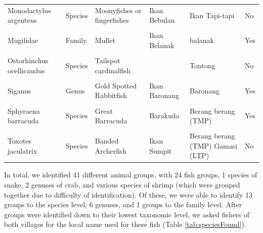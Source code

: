\documentclass[
]{article}
\begin{document}
\begin{landscape}
\begin{table}[H]
\begin{tabular}[t]{llllll}
Monodactylus argenteus & Species & Moonyfishes or fingerfishes & Ikan Bebulan & Ikan Tapi-tapi & No\\
\addlinespace
\cellcolor{gray!10}{Monodactylus argenteus} & \cellcolor{gray!10}{Species} & \cellcolor{gray!10}{Diamondfish} & \cellcolor{gray!10}{} & \cellcolor{gray!10}{Ikan Tapi-tapi} & \cellcolor{gray!10}{No}\\
Mugilidae & Family & Mullet & Ikan Belanak & balanak & Yes\\
\cellcolor{gray!10}{Omobranchus} & \cellcolor{gray!10}{Genus} & \cellcolor{gray!10}{Blenny} & \cellcolor{gray!10}{Jabingan} & \cellcolor{gray!10}{Ikan toto} & \cellcolor{gray!10}{No}\\
Ostorhinchus ocellicaudus & Species & Tailspot cardinalfish &  & Tontong & No\\
\cellcolor{gray!10}{Scatophagus argus} & \cellcolor{gray!10}{Species} & \cellcolor{gray!10}{Spotted Scat} & \cellcolor{gray!10}{Ikan Kiper} & \cellcolor{gray!10}{Titam/Titang} & \cellcolor{gray!10}{Yes}\\
\addlinespace
Siganus & Genus & Gold Spotted Rabbitfish & Ikan Baronang & Baronang & Yes\\
\cellcolor{gray!10}{Sphaeramia orbicularis} & \cellcolor{gray!10}{Species} & \cellcolor{gray!10}{Orbicular Cardinalfish} & \cellcolor{gray!10}{} & \cellcolor{gray!10}{Besing-besing} & \cellcolor{gray!10}{Yes}\\
Sphyraena barracuda & Species & Great Barracuda & Barakuda & Berang berang (TMP) & Yes\\
\cellcolor{gray!10}{Terapon jarbua} & \cellcolor{gray!10}{Species} & \cellcolor{gray!10}{Crescent Grunter} & \cellcolor{gray!10}{Kerong Kerong} & \cellcolor{gray!10}{Kerong-kerong} & \cellcolor{gray!10}{No}\\
Toxotes jaculatrix & Species & Banded Archerfish & Ikan Sumpit & Berang berang (TMP)
Gamasi (LTP) & No\\
\bottomrule
\end{tabular}
\end{table}
\end{landscape}

In total, we identified 41 different animal groups, with 24 fish groups, 1 species of snake, 2 genuses of crab, and various species of shrimp (which were grouped together due to difficulty of identification). Of these, we were able to identify 13 groups to the species level, 6 genuses, and 1 groups to the family level. After groups were identified down to their lowest taxonomic level, we asked fishers of both villages for the local name used for these fish (Table \ref{tab:speciesFound}).
\end{document}
